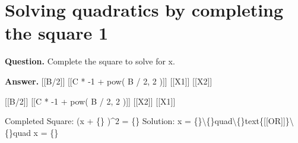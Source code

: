 \documentclass{article}
\begin{document}
\section*{Solving quadratics by completing the square 1}
\textbf{Question.} Complete the square to solve for x.

\textbf{Answer.} [[B/2]]
                        [[C * -1 + pow( B / 2, 2 )]]
                        [[X1]]
                        [[X2]]
                    
                    
                        [[B/2]]
                        [[C * -1 + pow( B / 2, 2 )]]
                        [[X2]]
                        [[X1]]
                    
                    
                        
                            Completed Square: 
                            (x + \{\} )\textasciicircum{}2 = \{\}  
                            Solution: 
                            x = \{\}\textbackslash\{\}quad\textbackslash\{\}text\{[[OR]]\}\textbackslash\{\}quad x = \{\}
\end{document}
